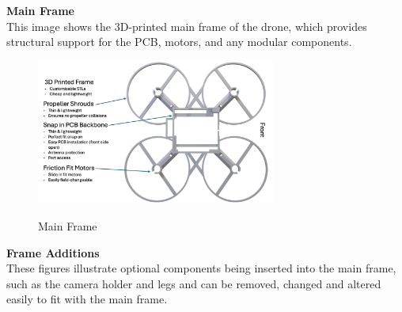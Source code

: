 \pagebreak
\textbf{Main Frame} \\
This image shows the 3D-printed main frame of the drone, which provides structural support for the PCB, motors, and any modular components.

\begin{figure}[H]
    \centering
    \includegraphics[width=0.7\textwidth]{img/assembly-3.png}\
    \caption{Main Frame}
\end{figure}

\textbf{Frame Additions} \\
These figures illustrate optional components being inserted into the main frame, such as the camera holder and legs and can be removed, changed and altered easily to fit with the main frame.


